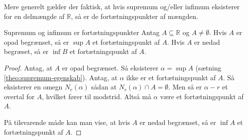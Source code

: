 Mere generelt gælder der faktisk, at hvis supremum og/eller infimum eksisterer for en delmængde af $\mathbb{R}$, så er de fortætningspunkter af mængden.

\begin{theorem}[label=theo:sup_fortætning]{Supremum og infimum er fortætningspunkter}{}
  Antag $A \subseteq \mathbb{R}$ og $A \neq \emptyset $.
  Hvis $A$ er opad begrænset, så er $\sup A$ et fortætningspunkt af $A$.
  Hvis $A$ er nedad begræset, så er $\inf B$ et fortætningspunkt af $A$. 
\end{theorem}
\begin{proof} 
  Antag, at $A$ er opad begrænset. 
  Så eksisterer $\alpha =\sup A$ (sætning \ref{theo:supremum-egenskab}).
  Antag, at $\alpha $ ikke er et fortætningspunkt af $A$. 
  Så eksisterer en omegn $N_r(\alpha )$ sådan at $N_r(\alpha ) \cap A=\emptyset $. 
  Men så er $\alpha - r$ et overtal for $A$, hvilket fører til modstrid.
  Altså må $\alpha $ være et fortætningspunkt af $A$. 

På tilsvarende måde kan man vise, at hvis $A$ er nedad begrænset, så er $\inf A$ et fortætningspunkt af $A$.  
\end{proof}

